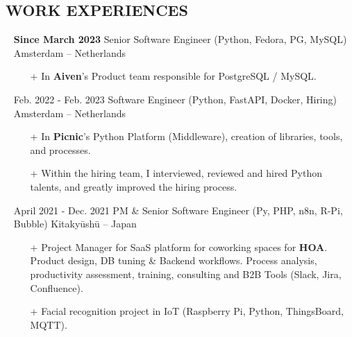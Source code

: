 \documentclass{res}
\begin{document}
  
\ifisanon
    \address{Some parts were removed. These are highlighted by \textit{(Anonymous)}}
\else
    \address{ \faMapMarker*~Pietersbergweg 53-B, 1105 BM, Amsterdam, NL ~~ \faPassport~French \\ \faAt~samuel@giffard.co ~~ \faMobile*~+33 (0) 7-69-69-12-02 ~~ \faMobile*~+31 (0) 6-8348-5505 ~~ \faWhatsapp~+32 (0) 4-84-14-10-33 \\ \\ \textbf{\faPython~Python Trainer, Engineer \& Evangelist} }
\fi

\begin{resume}

\section{\faBriefcase~WORK EXPERIENCES}
    \begin{itemize}
        \item[] \textbf{Since March 2023} \tabto{5cm} Senior Software Engineer (Python, Fedora, PG, MySQL) \hfill Amsterdam -- Netherlands
        \begin{itemize}
            \item[+] In \textbf{Aiven}'s Product team responsible for PostgreSQL / MySQL.
        \end{itemize}
        \item[] Feb. 2022 - Feb. 2023 \tabto{5cm} Software Engineer (Python, FastAPI, Docker, Hiring) \hfill Amsterdam -- Netherlands
        \begin{itemize}
            \item[+] In \textbf{Picnic}'s Python Platform (Middleware), creation of libraries, tools, and processes.
            \item[+] Within the hiring team, I interviewed, reviewed and hired Python talents, and greatly improved the hiring process.
        \end{itemize}
        \item[] April 2021 - Dec. 2021 \tabto{5cm} PM \& Senior Software Engineer (Py, PHP, n8n, R-Pi, Bubble) \hfill Kitaky\=ush\=u -- Japan
        \begin{itemize}
            \item[+] Project Manager for SaaS platform for coworking spaces for \textbf{HOA}. Product design, DB tuning \& Backend workflows. Process analysis, productivity assessment, training, consulting and B2B Tools (Slack, Jira, Confluence).
            \item[+] Facial recognition project in IoT (Raspberry Pi, Python, ThingsBoard, MQTT).

\end{itemize}
\end{itemize}
\end{resume}
\end{document}
